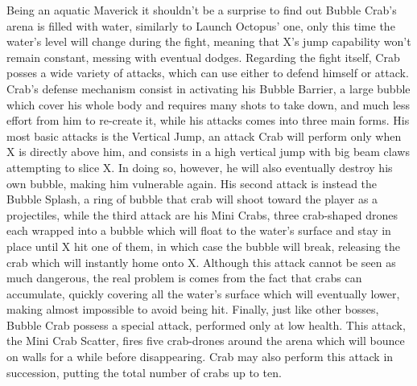 Being an aquatic Maverick it shouldn't be a surprise to find out Bubble Crab's arena is filled with water, similarly to Launch Octopus' one, only this time the water's level will change during the fight, meaning that X's jump capability won't remain constant, messing with eventual dodges. Regarding the fight itself, Crab posses a wide variety of attacks, which can use either to defend himself or attack. Crab's defense mechanism consist in activating his Bubble Barrier, a large bubble which cover his whole body and requires many shots to take down, and much less effort from him to re-create it, while his attacks comes into three main forms. His most basic attacks is the Vertical Jump, an attack Crab will perform only when X is directly above him, and consists in a high vertical jump with big beam claws attempting to slice X. In doing so, however, he will also eventually destroy his own bubble, making him vulnerable again. His second attack is instead the Bubble Splash, a ring of bubble that crab will shoot toward the player as a projectiles, while the third attack are his Mini Crabs,  three crab-shaped drones each wrapped into a bubble which will float to the water's surface and stay in place until X hit one of them, in which case the bubble will break, releasing the crab which will instantly home onto X. Although this attack cannot be seen as much dangerous, the real problem is comes from the fact that crabs can accumulate, quickly covering all the water's surface which will eventually lower, making almost impossible to avoid being hit. Finally, just like other bosses, Bubble Crab possess a special attack, performed only at low health. This attack, the Mini Crab Scatter, fires five crab-drones around the arena which will bounce on walls for a while before disappearing. Crab may also perform this attack in succession, putting the total number of crabs up to ten.
